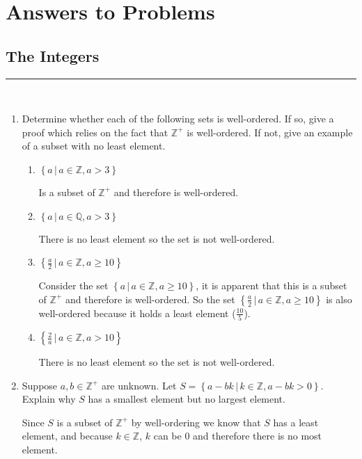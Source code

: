 \documentclass[class=article, crop=false]{standalone}
\def\integers{{\mathbb Z}}
\def\rationals{{\mathbb Q}}
\begin{document}
	
\section{Answers to Problems}

\subsection{The Integers}
\hfill {}
\rule{\textwidth}{1pt}\\
\begin{enumerate}
\item
  Determine whether each of the following sets is well-ordered.  If
  so, give a proof which relies on the fact that $\integers^+$ is well-ordered.
  If not, give an example of a subset with no least element.\hfill{}
  \begin{enumerate}
  \item
	$\left\{a\,\big|\, a\in\integers,a>3\right\}$

	Is a subset of $\integers^+$ and therefore is well-ordered.
  \item
	$\left\{a\,\big|\, a\in\rationals,a>3\right\}$

	There is no least element so the set is not well-ordered.
  \item
	$\left\{\frac a2\,\big|\, a\in\integers,a\geq 10\right\}$

	Consider the set $\left\{a\,\big|\, a\in\integers,a\geq 10\right\}$, it is apparent that this is a subset of $\integers^+$ and therefore is well-ordered.
	So the set $\left\{\frac a2\,\big|\, a\in\integers,a\geq 10\right\}$ is also well-ordered because it holds a least element ($\frac{10}{5}$).
  \item
	$\left\{\frac 2a\,\big|\, a\in\integers,a>10\right\}$

	There is no least element so the set is not well-ordered.
  \end{enumerate}

\item
  Suppose $a,b\in\integers^+$ are unknown.  Let
  $S=\left\{a-bk\,\big|\, k\in\integers,a-bk>0\right\}$.
  Explain why $S$ has a smallest element but no largest element.\hfill{}

  Since $S$ is a subset of $\integers^+$ by well-ordering we know that $S$ has a least element, and because $k\in\integers$,
  $k$ can be $0$ and therefore there is no most element.


\end{enumerate}
\end{document}
